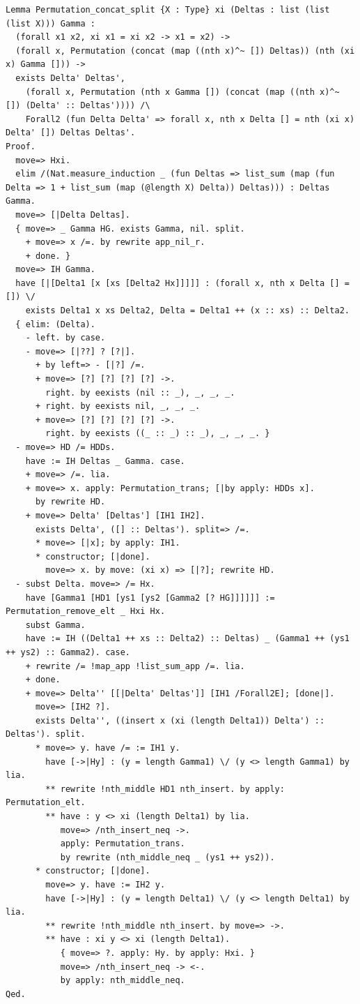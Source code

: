 \documentclass[10pt,a4paper]{article}
\begin{document}
\begin{lstlisting}[style=authorcoq]
Lemma Permutation_concat_split {X : Type} xi (Deltas : list (list (list X))) Gamma :
  (forall x1 x2, xi x1 = xi x2 -> x1 = x2) ->
  (forall x, Permutation (concat (map ((nth x)^~ []) Deltas)) (nth (xi x) Gamma [])) ->
  exists Delta' Deltas',
    (forall x, Permutation (nth x Gamma []) (concat (map ((nth x)^~ []) (Delta' :: Deltas')))) /\
    Forall2 (fun Delta Delta' => forall x, nth x Delta [] = nth (xi x) Delta' []) Deltas Deltas'.
Proof.
  move=> Hxi.
  elim /(Nat.measure_induction _ (fun Deltas => list_sum (map (fun Delta => 1 + list_sum (map (@length X) Delta)) Deltas))) : Deltas Gamma.
  move=> [|Delta Deltas].
  { move=> _ Gamma HG. exists Gamma, nil. split.
    + move=> x /=. by rewrite app_nil_r.
    + done. }
  move=> IH Gamma.
  have [|[Delta1 [x [xs [Delta2 Hx]]]]] : (forall x, nth x Delta [] = []) \/
    exists Delta1 x xs Delta2, Delta = Delta1 ++ (x :: xs) :: Delta2.
  { elim: (Delta).
    - left. by case.
    - move=> [|??] ? [?|].
      + by left=> - [|?] /=.
      + move=> [?] [?] [?] [?] ->.
        right. by eexists (nil :: _), _, _, _.
      + right. by eexists nil, _, _, _.
      + move=> [?] [?] [?] [?] ->.
        right. by eexists ((_ :: _) :: _), _, _, _. }
  - move=> HD /= HDDs.
    have := IH Deltas _ Gamma. case.
    + move=> /=. lia.
    + move=> x. apply: Permutation_trans; [|by apply: HDDs x].
      by rewrite HD.
    + move=> Delta' [Deltas'] [IH1 IH2].
      exists Delta', ([] :: Deltas'). split=> /=.
      * move=> [|x]; by apply: IH1.
      * constructor; [|done].
        move=> x. by move: (xi x) => [|?]; rewrite HD.
  - subst Delta. move=> /= Hx.
    have [Gamma1 [HD1 [ys1 [ys2 [Gamma2 [? HG]]]]]] := Permutation_remove_elt _ Hxi Hx.
    subst Gamma.
    have := IH ((Delta1 ++ xs :: Delta2) :: Deltas) _ (Gamma1 ++ (ys1 ++ ys2) :: Gamma2). case.
    + rewrite /= !map_app !list_sum_app /=. lia.
    + done.
    + move=> Delta'' [[|Delta' Deltas']] [IH1 /Forall2E]; [done|].
      move=> [IH2 ?].
      exists Delta'', ((insert x (xi (length Delta1)) Delta') :: Deltas'). split.
      * move=> y. have /= := IH1 y.
        have [->|Hy] : (y = length Gamma1) \/ (y <> length Gamma1) by lia.
        ** rewrite !nth_middle HD1 nth_insert. by apply: Permutation_elt.
        ** have : y <> xi (length Delta1) by lia.
           move=> /nth_insert_neq ->.
           apply: Permutation_trans.
           by rewrite (nth_middle_neq _ (ys1 ++ ys2)).
      * constructor; [|done].
        move=> y. have := IH2 y.
        have [->|Hy] : (y = length Delta1) \/ (y <> length Delta1) by lia.
        ** rewrite !nth_middle nth_insert. by move=> ->.
        ** have : xi y <> xi (length Delta1).
           { move=> ?. apply: Hy. by apply: Hxi. }
           move=> /nth_insert_neq -> <-.
           by apply: nth_middle_neq.
Qed.


\end{lstlisting}
\end{document}
